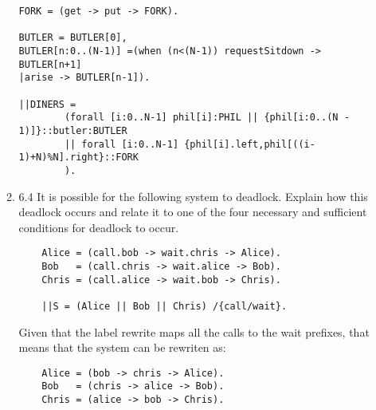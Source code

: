 \documentclass{article}
\begin{document}
\begin{enumerate}
\begin{enumerate}
\begin{verbatim}
FORK = (get -> put -> FORK).

BUTLER = BUTLER[0],
BUTLER[n:0..(N-1)] =(when (n<(N-1)) requestSitdown -> BUTLER[n+1]
|arise -> BUTLER[n-1]).

||DINERS =
        (forall [i:0..N-1] phil[i]:PHIL || {phil[i:0..(N - 1)]}::butler:BUTLER
        || forall [i:0..N-1] {phil[i].left,phil[((i-1)+N)%N].right}::FORK
        ).  
\end{verbatim}
\item 6.4
  It is possible for the following system to deadlock. Explain how this deadlock occurs and relate it to one of the four necessary and sufficient conditions for deadlock to occur.
    \begin{verbatim}
    Alice = (call.bob -> wait.chris -> Alice).
    Bob   = (call.chris -> wait.alice -> Bob).
    Chris = (call.alice -> wait.bob -> Chris).

    ||S = (Alice || Bob || Chris) /{call/wait}.
\end{verbatim}
    Given that the label rewrite maps all the calls to the wait prefixes, that means that the system can be rewriten as:
    \begin{verbatim}
    Alice = (bob -> chris -> Alice).
    Bob   = (chris -> alice -> Bob).
    Chris = (alice -> bob -> Chris).


\end{verbatim}
\end{enumerate}
\end{enumerate}
\end{document}
